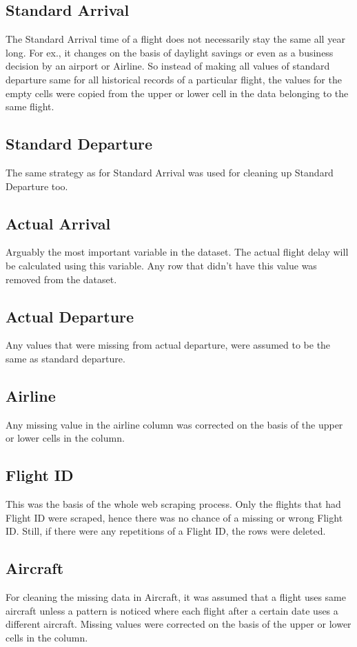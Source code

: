 \subsection{Standard Arrival}
The Standard Arrival time of a flight does not necessarily stay the same all year long. For ex., it changes on the basis of daylight savings or even as a business decision by an airport or Airline. So
instead of making all values of standard departure same for all historical records of a particular flight, the values for the empty cells were copied from the upper or lower cell in the data belonging to the same flight.

\subsection{Standard Departure}
The same strategy as for Standard Arrival was used for cleaning up Standard Departure too.

\subsection{Actual Arrival}
Arguably the most important variable in the dataset. The actual flight delay will be calculated using this variable. Any row that didn't have this value was removed from the dataset.

\subsection{Actual Departure}
Any values that were missing from actual departure, were assumed to be the same as standard departure.

\subsection{Airline}
Any missing value in the airline column was corrected on the basis of the upper or lower cells in the column. 

\subsection{Flight ID}
This was the basis of the whole web scraping process. Only the flights that had Flight ID were scraped, hence there was no chance of a missing or wrong Flight ID. Still, if there were any repetitions of a Flight ID, the rows were deleted.

\subsection{Aircraft}
For cleaning the missing data in Aircraft, it was assumed that a flight uses same aircraft unless a pattern is noticed where each flight after a certain date uses a different aircraft. Missing values were corrected on the basis of the upper or lower cells in the column.

